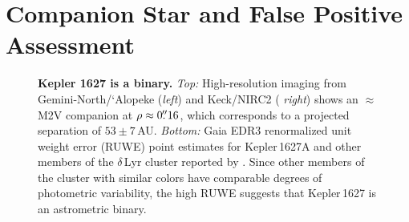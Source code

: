 \documentclass[12pt,modern,twocolumn,tighten]{aastex63}
\begin{document}
\section{Companion Star and False Positive Assessment}
\label{app:companionstar}

\begin{figure}[tp]
	\begin{center}
		\leavevmode

		\vspace{-0.1cm}
	\end{center}
	\vspace{-0.7cm}
	\caption{
    {\bf Kepler 1627 is a binary.} {\it Top:} High-resolution imaging
    from Gemini-North/`Alopeke ({\it left}) and Keck/NIRC2 ({\it
    right}) shows an $\approx$M2V companion at $\rho \approx
    0\mbox{$.\!\!^{\prime\prime}$}16$, which corresponds to a projected separation of
    $53\pm7$\,AU.  {\it Bottom:} Gaia EDR3 renormalized unit weight
    error (RUWE) point estimates for Kepler\,1627A and other members
    of the $\delta$\,Lyr cluster reported by \citet{KounkelCovey2019}.  Since other members of the cluster
    with similar colors have comparable degrees of photometric
    variability, the high RUWE suggests that Kepler\,1627 is an
    astrometric binary. 
    \label{fig:kep1627binary}
	}
\end{figure}
\end{document}
